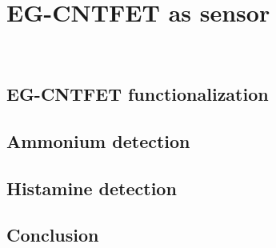 \chapter{EG-CNTFET as sensor}
\label{cap:chapter4}

\newpage
\thispagestyle{empty}
\ %
\newpage


\section{EG-CNTFET functionalization}
\label{sec:functionalization}




\section{Ammonium detection}
\label{sec:ammonium}




\section{Histamine detection}
\label{sec:histamine}




\section{Conclusion}

\newpage
\thispagestyle{empty}
\ %
\newpage